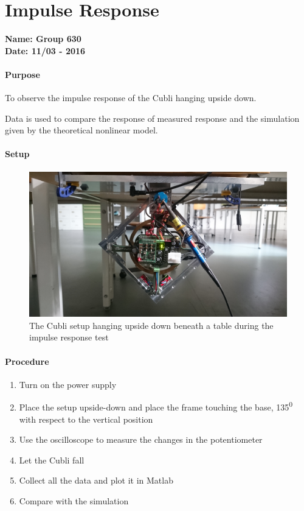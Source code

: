 \chapter{Impulse Response}\label{comparisonModelReal} 
\textbf{Name: Group 630}\\
\textbf{Date: 11/03 - 2016}

\subsubsection{Purpose}
To observe the impulse response of the Cubli hanging upside down.

Data is used to compare the response of measured response and the simulation given by the theoretical nonlinear model.

\subsubsection{Setup}
\begin{figure}[H] 
	\centering 
	\includegraphics[scale=0.1]{figures/impulseResponseSetup}
	\caption{The Cubli setup hanging upside down beneath a table during the impulse response test}
	\label{impulseResponseTestPicture}
\end{figure} 

\subsubsection{Procedure}
\begin{enumerate}
	\item Turn on the power supply
	\item Place the setup upside-down and place the frame touching the base, \si{135^0} with respect to the vertical position
	\item Use the oscilloscope to measure the changes in the potentiometer 
	\item Let the Cubli fall
	\item Collect all the data and plot it in Matlab
	\item Compare with the simulation 
	
\end{enumerate}

